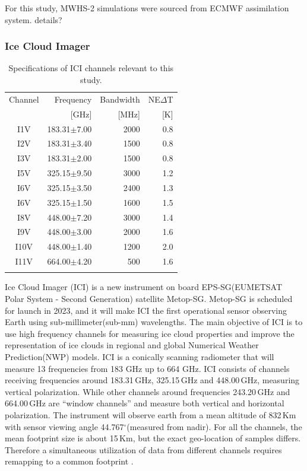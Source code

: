 \documentclass[amt, manuscript]{copernicus}
\newcommand{\todo}[1]{{\color{red} #1}}
\begin{document}
For this study, MWHS-2 simulations were sourced from ECMWF assimilation system. \todo{details?}

\subsubsection{Ice Cloud Imager}
%
\begin{table}[t]	
	\caption{Specifications of ICI channels relevant to this study.}
	\label{tab:ICI_MWI_channels}
	\begin{tabular}{crrr}
		\tophline
		Channel & Frequency 	& Bandwidth  	&NE$\Delta$T	\\
				& [GHz]			& [MHz]			& [K]			\\
		\middlehline
		I1V&	183.31$\pm$7.00    & 2000 			& 0.8 		\\
		I2V&	183.31$\pm$3.40    & 1500 			& 0.8 		\\
		I3V&	183.31$\pm$2.00    & 1500			& 0.8 		\\
		I5V&	325.15$\pm$9.50    & 3000			& 1.2 		\\
		I6V&	325.15$\pm$3.50    & 2400			& 1.3 		\\
		I6V&	325.15$\pm$1.50    & 1600			& 1.5 		\\
		I8V&	448.00$\pm$7.20    & 3000			& 1.4 		\\
		I9V&	448.00$\pm$3.00    & 2000			& 1.6 		\\
		I10V&	448.00$\pm$1.40    & 1200			& 2.0 		\\
		I11V&	664.00$\pm$4.20    & \phantom{0}500	& 1.6 		\\		
		\bottomhline
	\end{tabular}
	\belowtable{} %
\end{table}

Ice Cloud Imager (ICI) is a new instrument on board EPS-SG(EUMETSAT Polar System - Second Generation) satellite Metop-SG. Metop-SG is scheduled for launch in 2023, and it will make ICI the first operational sensor observing Earth using sub-millimeter(sub-mm) wavelengths. The main objective of ICI is to use high frequency channels for measuring ice cloud properties and improve the representation of ice clouds in regional and global Numerical Weather Prediction(NWP) models. ICI is a conically scanning radiometer that will measure 13 frequencies from 183 GHz up to 664 GHz.  ICI consists of channels receiving frequencies around 183.31\,GHz, 325.15\,GHz and 448.00\,GHz, measuring vertical polarization. While other channels around frequencies 243.20\,GHz and 664.00\,GHz are ``window channels'' and measure both vertical and horizontal polarization. The instrument will observe earth from a mean altitude of 832\,Km with sensor viewing angle 44.767$^\circ$(measured from nadir). For all the channels, the mean footprint size is about 15\,Km, but the exact geo-location of samples differs. Therefore a simultaneous utilization of data from different channels requires remapping to a common footprint \citep{eriksson:towar:20}.
\end{document}

